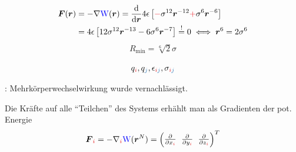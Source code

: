 \begin{sectionbox}\nospacing
  \begin{align*}
    \vec{F}(\vec{r})&=-\nabla\Wpot(\rvec)=\frac{\diff}{\diff\vec{r}}4\epsilon\left[\rd{-}\sigma^{12}\rvec^{-12}\rd{+}\sigma^6\rvec^{-6}\right]\nalign
    &=4\epsilon\left[12\sigma^{12}\rvec^{-13}-6\sigma^6\rvec^{-7}\right]\eqs{!}0\iff \rvec^6=2\sigma^6
  \end{align*}
  \begin{align}
    R_{\text{min}}=\sqrt[6]{2}\sigma
  \end{align}
\end{sectionbox}
\begin{notebox}[Fitparameter]\nospacing
  \begin{align*}
    q_{\idxi},q_{\idxj},\epsilon_{\idxi\idxj},\sigma_{\idxi\idxj}
  \end{align*}
\end{notebox}
\begin{notebox}[Nebenbemerkung]\nospacing
  \begin{numberlist}
    \item {}: Mehrkörperwechselwirkung wurde vernachlässigt.
    \item Die Kräfte auf alle ``Teilchen'' des Systems erhählt man als Gradienten der pot. Energie
      \begin{align*}
        \vec{F}_{\idxi}=-\nabla_{\idxi}\Wpot(\rvec^N)=\vect{\pfrac{}{x_{\idxi}} & \pfrac{}{y_{\idxi}}& \pfrac{}{z_{\idxi}}}^{T}
      \end{align*}
  \end{numberlist}
\end{notebox}
